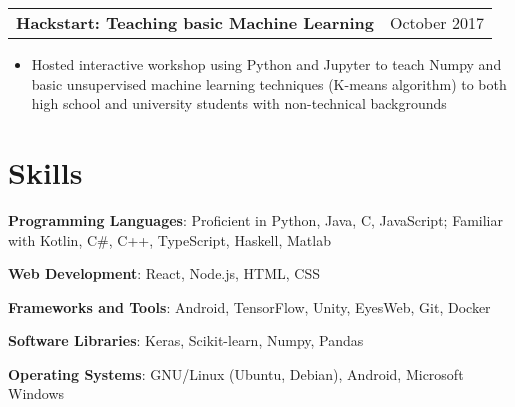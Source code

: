 \documentclass[a4paper, 10pt]{article}
\makeatletter
\newenvironment{details}{\addvspace{3pt} \begin{tabu} to \textwidth {@{}X[2l] X[1r]@{}}}{\end{tabu}}
\newcommand{\timerange}[1]{\normalsize #1}
\newcommand{\leadership}[1]{\normalsize \textbf{#1}}
\newcommand{\skill}[1]{\small \textbf{#1}}
\newenvironment{info}{\small \begin{itemize}[
    noitemsep,
    topsep=-3pt,
    leftmargin=*,
    align=parleft
]}{\end{itemize}}
\makeatother
\begin{document}
        \begin{details}
            \leadership{Hackstart: Teaching basic Machine Learning} & \timerange{October 2017}
        \end{details}

        \begin{info}
            \item Hosted interactive workshop using Python and Jupyter to teach Numpy and basic unsupervised machine learning techniques (K-means algorithm) to both high school and university students with non-technical backgrounds
        \end{info}

    \section*{Skills}
        
        \skill{Programming Languages}: 
        \small{Proficient in Python, Java, C, JavaScript; Familiar with Kotlin, C\#, C++, TypeScript, Haskell, Matlab}

        \skill{Web Development}: 
        \small{React, Node.js, HTML, CSS}

        \skill{Frameworks and Tools}:
        \small{Android, TensorFlow, Unity, EyesWeb, Git, Docker}

        \skill{Software Libraries}:
        \small{Keras, Scikit-learn, Numpy, Pandas}

        \skill{Operating Systems}: 
        \small{GNU/Linux (Ubuntu, Debian), Android, Microsoft Windows}

    
\end{document}

